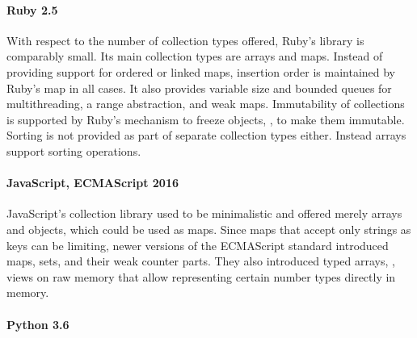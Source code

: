 \documentclass[sigconf, 10pt]{acmart}
\begin{document}
\paragraph{Ruby 2.5}

With respect to the number of collection types offered,
Ruby's library is comparably small.
Its main collection types are arrays and maps.
Instead of providing support for ordered or linked maps,
insertion order is maintained by Ruby's  map in all cases.
It also provides variable size and bounded queues for multithreading, a range abstraction,
and weak maps.
Immutability of collections is supported by Ruby's mechanism to freeze objects,
\ie, to make them immutable.
Sorting is not provided as part of separate collection types either.
Instead arrays support sorting operations.

\paragraph{JavaScript, ECMAScript 2016}

JavaScript's collection library used to be minimalistic and offered merely
arrays and objects, which could be used as maps.
Since maps that accept only strings as keys can be limiting,
newer versions of the ECMAScript standard introduced maps, sets,
and their weak counter parts.
They also introduced typed arrays, \ie,
views on raw memory that allow representing certain number types
directly in memory.

\paragraph{Python 3.6}

\end{document}
